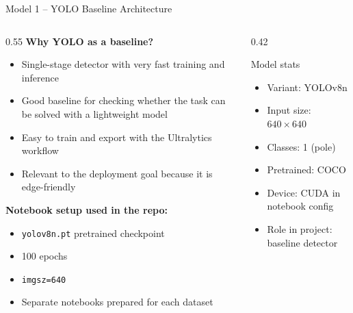 \documentclass[aspectratio=169]{beamer}
\begin{document}
\begin{frame}[shrink=2]{Model 1 -- YOLO Baseline Architecture}
  \begin{columns}
    \begin{column}{0.55\textwidth}
      \textbf{Why YOLO as a baseline?}
      \begin{itemize}
        \item Single-stage detector with very fast training and inference
        \item Good baseline for checking whether the task can be solved with a lightweight model
        \item Easy to train and export with the Ultralytics workflow
        \item Relevant to the deployment goal because it is edge-friendly
      \end{itemize}
      \vspace{0.5em}
      \textbf{Notebook setup used in the repo:}
      \begin{itemize}
        \item \texttt{yolov8n.pt} pretrained checkpoint
        \item 100 epochs
        \item \texttt{imgsz=640}
        \item Separate notebooks prepared for each dataset
      \end{itemize}
    \end{column}
    \begin{column}{0.42\textwidth}
      \begin{block}{Model stats}
        \begin{itemize}
          \item Variant: YOLOv8n
          \item Input size: $640\times640$
          \item Classes: 1 (pole)
          \item Pretrained: COCO
          \item Device: CUDA in notebook config
          \item Role in project: baseline detector
        \end{itemize}
      \end{block}
    \end{column}
  \end{columns}
\end{frame}
\end{document}
